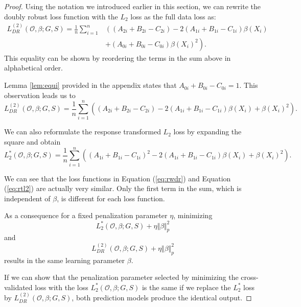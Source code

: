\documentclass[12pt, a4paper]{scrartcl}
\theoremstyle{definition}
\theoremstyle{plain}
\numberwithin{equation}{section}
\numberwithin{figure}{section}
\numberwithin{table}{section}
\begin{document}
	\begin{proof}
		Using the notation we introduced earlier in this section, we can rewrite the doubly robust loss function with the $L_2$ loss as the full data loss as:
		\begin{equation}\label{eq:rwdr}
		\begin{split}
		L_{DR}^{(2)}(\mathcal{O}, \beta; G,S) ={} \frac{1}{n} \sum_{i=1}^n & \left((A_{2i}+B_{2i}-C_{2i}) - 2(A_{1i}+B_{1i}-C_{1i})\beta(X_i) \right.\\
		& \left.+ (A_{0i}+B_{0i}-C_{0i})\beta(X_i)^2\right).
		\end{split}
		\end{equation}
		This equality can be shown by reordering the terms in the sum above in alphabetical order.
		
		Lemma \ref{lem:equi} provided in the appendix states that $A_{0i}+B_{0i}-C_{0i} = 1$.
		This observation leads us to
		\begin{equation*}
		L_{DR}^{(2)}(\mathcal{O}, \beta; G,S) = \frac{1}{n} \sum_{i=1}^n  \left((A_{2i}+B_{2i}-C_{2i}) - 2(A_{1i}+B_{1i}-C_{1i})\beta(X_i) + \beta(X_i)^2\right).
		\end{equation*}
		
		We can also reformulate the response transformed $L_2$ loss by expanding the square and obtain
		\begin{equation}\label{eq:rtl2}
		L_2^*(\mathcal{O}, \beta; G,S) = \frac{1}{n} \sum_{i=1}^n \left((A_{1i}+B_{1i}-C_{1i})^2 - 2 (A_{1i}+B_{1i}-C_{1i}) \beta(X_i)+\beta(X_i)^2\right).
		\end{equation}
		
		We can see that the loss functions in Equation (\ref{eq:rwdr}) and Equation (\ref{eq:rtl2}) are actually very similar.
		Only the first term in the sum, which is independent of $\beta$, is different for each loss function.
	
		As a consequence for a fixed penalization parameter $\eta$, minimizing 
		\begin{equation*}
		L_2^*(\mathcal{O}, \beta; G,S) + \eta \Vert \beta \Vert_p^2
		\end{equation*}
		and 
		\begin{equation*}
		L_{DR}^{(2)}(\mathcal{O}, \beta; G,S) + \eta \Vert \beta \Vert_p^2
		\end{equation*}
		 results in the same learning parameter $\beta$.
		 
		 If we can show that the penalization parameter selected by minimizing the cross-validated loss with the loss $L_2^*(\mathcal{O}, \beta; G,S)$ is the same if we replace the $L_2^*$ loss by $L_{DR}^{(2)}(\mathcal{O}, \beta; G,S)$, both prediction models produce the identical output.
		

\end{proof}
\end{document}
